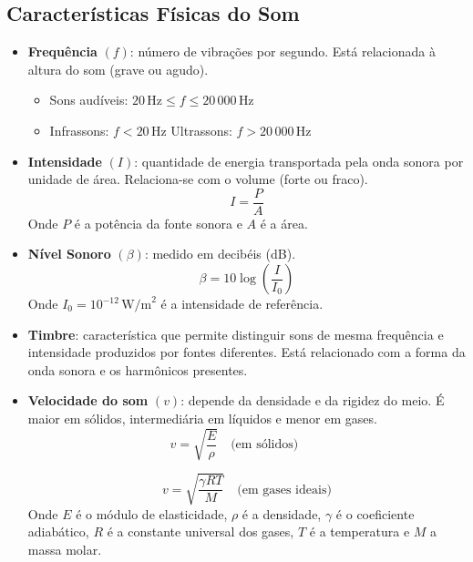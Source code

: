 \documentclass[a4paper,12pt]{article}
\begin{document}
\begin{multicols}{2}
\section{Características Físicas do Som}
\begin{itemize}
    \item \textbf{Frequência} $(f)$: número de vibrações por segundo. Está relacionada à altura do som (grave ou agudo).
    \begin{itemize}
        \item Sons audíveis: $20\,\text{Hz} \leq f \leq 20\,000\,\text{Hz}$
        \item Infrassons: $f < 20\,\text{Hz}$ \quad Ultrassons: $f > 20\,000\,\text{Hz}$
    \end{itemize}
    
    \item \textbf{Intensidade} $(I)$: quantidade de energia transportada pela onda sonora por unidade de área. Relaciona-se com o volume (forte ou fraco).
    \[
        I = \frac{P}{A}
    \]
    Onde $P$ é a potência da fonte sonora e $A$ é a área.
    
    \item \textbf{Nível Sonoro} $(\beta)$: medido em decibéis (dB).
    \[
        \beta = 10 \log \left( \frac{I}{I_0} \right)
    \]
    Onde $I_0 = 10^{-12}\,\text{W/m}^2$ é a intensidade de referência.
    
    \item \textbf{Timbre}: característica que permite distinguir sons de mesma frequência e intensidade produzidos por fontes diferentes. Está relacionado com a forma da onda sonora e os harmônicos presentes.
    
    \item \textbf{Velocidade do som} $(v)$: depende da densidade e da rigidez do meio. É maior em sólidos, intermediária em líquidos e menor em gases.
    \[
        v = \sqrt{\frac{E}{\rho}} \quad \text{(em sólidos)} \qquad
    \]

    \[
        v = \sqrt{\frac{\gamma R T}{M}} \quad \text{(em gases ideais)}
    \]
    Onde $E$ é o módulo de elasticidade, $\rho$ é a densidade, $\gamma$ é o coeficiente adiabático, $R$ é a constante universal dos gases, $T$ é a temperatura e $M$ a massa molar.
\end{itemize}


\end{multicols}
\end{document}
